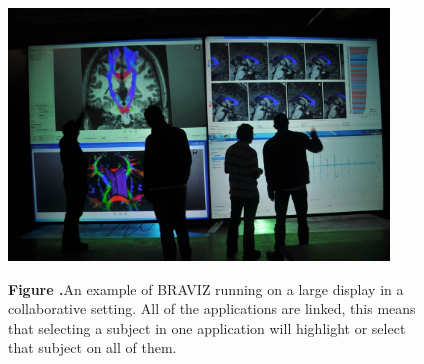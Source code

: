 \documentclass[utf8]{frontiersSCNS} %
\begin{document}
\begin{figure}[h!]
\begin{center}
\includegraphics[width=0.9\textwidth]{figures/imagine.jpg}
\end{center}
 \textbf{\label{fig_imagine} Figure .}{An example of BRAVIZ running on a large display in a collaborative setting. All of the applications are linked, this means that selecting a subject in one application will highlight or select that subject on all of them.}
\end{figure}
\end{document}
